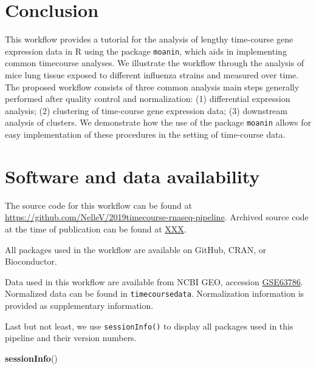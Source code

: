 \documentclass[9pt,a4paper,]{extarticle}
\newenvironment{Shaded}{\begin{snugshade}}{\end{snugshade}}
\newcommand{\KeywordTok}[1]{\textcolor[rgb]{0.13,0.29,0.53}{\textbf{#1}}}
\newcommand{\NormalTok}[1]{#1}
\begin{document}
\hypertarget{conclusion}{%
\section{Conclusion}\label{conclusion}}

This workflow provides a tutorial for the analysis of lengthy time-course gene
expression data in R using the package \texttt{moanin}, which aids in implementing
common timecourse analyses. We illustrate the workflow through the analysis of
mice lung tissue exposed to different influenza strains and measured over time.
The proposed workflow consists of three common analysis main steps
generally performed after quality control and normalization: (1) differential
expression analysis; (2) clustering of time-course gene expression data; (3)
downstream analysis of clusters. We demonstrate how the use of the package
\texttt{moanin} allows for easy implementation of these procedures in the setting of
time-course data.

\hypertarget{software-and-data-availability}{%
\section{Software and data availability}\label{software-and-data-availability}}

The source code for this workflow can be found at
\url{https://github.com/NelleV/2019timecourse-rnaseq-pipeline}.
Archived source code at the time of publication can be found at \url{XXX}.

All packages used in the workflow are available on GitHub, CRAN, or
Bioconductor.

Data used in this workflow are available from NCBI GEO, accession
\href{https://www.ncbi.nlm.nih.gov/geo/query/acc.cgi?acc=GSE63786}{GSE63786}.
Normalized data can be found in \texttt{timecoursedata}. Normalization information is
provided as supplementary information.

Last but not least, we use \texttt{sessionInfo()} to display all packages used in
this pipeline and their version numbers.

\begin{Shaded}
\begin{Highlighting}[]
\KeywordTok{sessionInfo}\NormalTok{()}
\end{Highlighting}
\end{Shaded}
\end{document}

